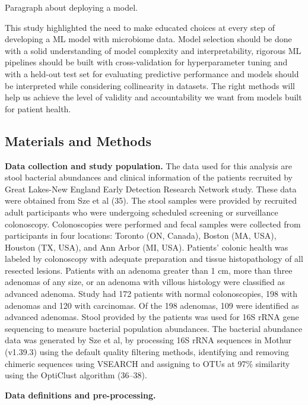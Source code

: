 \documentclass[11pt,]{article}
\begin{document}
Paragraph about deploying a model.

This study highlighted the need to make educated choices at every step
of developing a ML model with microbiome data. Model selection should be
done with a solid understanding of model complexity and
interpretability, rigorous ML pipelines should be built with
cross-validation for hyperparameter tuning and with a held-out test set
for evaluating predictive performance and models should be interpreted
while considering collinearity in datasets. The right methods will help
us achieve the level of validity and accountability we want from models
built for patient health.

\subsection{Materials and Methods}\label{materials-and-methods}

\textbf{Data collection and study population.} The data used for this
analysis are stool bacterial abundances and clinical information of the
patients recruited by Great Lakes-New England Early Detection Research
Network study. These data were obtained from Sze et al (35). The stool
samples were provided by recruited adult participants who were
undergoing scheduled screening or surveillance colonoscopy.
Colonoscopies were performed and fecal samples were collected from
participants in four locations: Toronto (ON, Canada), Boston (MA, USA),
Houston (TX, USA), and Ann Arbor (MI, USA). Patients' colonic health was
labeled by colonoscopy with adequate preparation and tissue
histopathology of all resected lesions. Patients with an adenoma greater
than 1 cm, more than three adenomas of any size, or an adenoma with
villous histology were classified as advanced adenoma. Study had 172
patients with normal colonoscopies, 198 with adenomas and 120 with
carcinomas. Of the 198 adenomas, 109 were identified as advanced
adenomas. Stool provided by the patients was used for 16S rRNA gene
sequencing to measure bacterial population abundances. The bacterial
abundance data was generated by Sze et al, by processing 16S rRNA
sequences in Mothur (v1.39.3) using the default quality filtering
methods, identifying and removing chimeric sequences using VSEARCH and
assigning to OTUs at 97\% similarity using the OptiClust algorithm
(36--38).

\textbf{Data definitions and pre-processing.}
\end{document}
